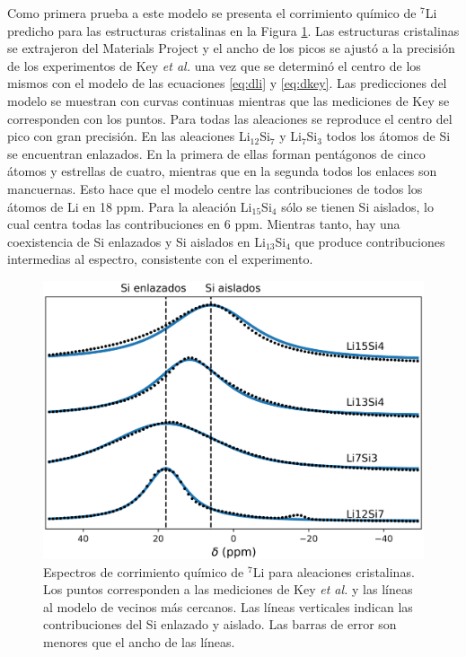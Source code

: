 Como primera prueba a este modelo se presenta el corrimiento químico de $^7$Li 
predicho para las estructuras cristalinas en la Figura \ref{fig:c-nmr}. 
Las estructuras cristalinas se extrajeron del Materials Project 
\cite{materials_project} y el ancho de los picos se ajustó a la precisión de los 
experimentos de Key \textit{et al.} \cite{key2009} una vez que se determinó el 
centro de los mismos con el modelo de las ecuaciones \ref{eq:dli} y \ref{eq:dkey}.
Las predicciones del modelo se muestran con curvas continuas mientras que las 
mediciones de Key se corresponden con los puntos. Para todas las aleaciones se 
reproduce el centro del pico con gran precisión. En las aleaciones 
Li$_{12}$Si$_7$ y Li$_7$Si$_3$ todos los átomos de Si se encuentran enlazados. 
En la primera de ellas forman pentágonos de cinco átomos y estrellas de cuatro, 
mientras que en la segunda todos los enlaces son mancuernas. Esto hace que el 
modelo centre las contribuciones de todos los átomos de Li en 18 ppm. Para 
la aleación Li$_{15}$Si$_4$ sólo se tienen Si aislados, lo cual centra todas las
contribuciones en 6 ppm. Mientras tanto, hay una coexistencia de Si enlazados y 
Si aislados en Li$_{13}$Si$_4$ que produce contribuciones intermedias al espectro,
consistente con el experimento.
\begin{figure}[h!]
    \centering
    \includegraphics[width=.7\textwidth]{Silicio/prediccion/resultados/nmr/c-nmr.png}
    \caption{Espectros de corrimiento químico de $^7$Li para aleaciones 
    cristalinas. Los puntos corresponden a las mediciones de Key \textit{et al.} \cite{key2009}
    y las líneas al modelo de vecinos más cercanos. Las líneas verticales indican las 
    contribuciones del Si enlazado y aislado. Las barras de error son menores que
    el ancho de las líneas.}
    \label{fig:c-nmr}
\end{figure}

